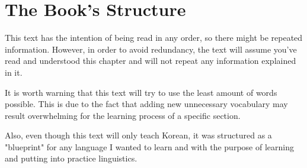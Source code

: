 \section{The Book's Structure}

This text has the intention of being read in any order, so there might be repeated information. However, in order to avoid redundancy, the text will assume you've read and understood this chapter and will not repeat any information explained in it.

It is worth warning that this text will try to use the least amount of words possible. This is due to the fact that adding new unnecessary vocabulary may result overwhelming for the learning process of a specific section. 

Also, even though this text will only teach Korean, it was structured as a "blueprint" for any language I wanted to learn and with the purpose of learning and putting into practice linguistics. 